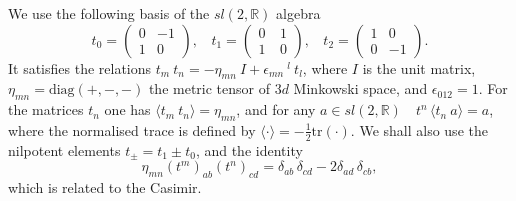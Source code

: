 \documentclass[a4paper,12pt]{article}
\newcommand{\rr}{\mathbb{R}}
\begin{document}
We use  the following basis of the $sl(2,\rr)$ algebra
\begin{equation}\label{T}
  t_0=\left( \begin{array}{cr}
  0&-1\\1&0 \end{array}\right),~~~~
   t_1=\left( \begin{array}{cr}
  0&~1\\1&~0 \end{array}\right),~~~~
 t_2=\left( \begin{array}{cr}
  1&0\\0&-1 \end{array}\right).
\end{equation}
It satisfies the relations
$t_m~t_n=-\eta_{mn}~I+\epsilon_{mn}~^l~t_l$, where $I$ is the unit
matrix, $\eta_{mn}=\mbox{diag}(+,-,-)$ the metric tensor of  $3d$
Minkowski space, and $\epsilon_{012}=1$. For the matrices $t_n$ one
has $\langle t_m~t_n \rangle =\eta_{mn}$,
 and for any $a\in sl(2,\rr)$ \,\,
$t^n\,\langle t_n~a \rangle =a$, where the normalised trace is defined
by $\langle \cdot\rangle=-\frac{1}{2}\mbox{tr} (\cdot )$. We shall
also use the nilpotent elements $t_\pm =t_1\pm t_0$, and
the identity
\begin{equation}\label{delta-2delta}
\eta_{mn}(t^m)_{ab}(t^n)_{cd}=\delta_{ab}\,\delta_{cd}
-2\delta_{ad}\,\delta_{cb},
\end{equation}
which is related to the Casimir.
\end{document}
